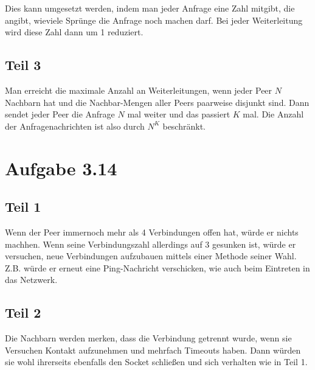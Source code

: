 \documentclass[10pt,a4paper]{article}
\begin{document}
Dies kann umgesetzt werden, indem man jeder Anfrage eine Zahl mitgibt, die
angibt, wieviele Sprünge die Anfrage noch machen darf. Bei jeder Weiterleitung
wird diese Zahl dann um 1 reduziert.

\subsection{Teil 3}

Man erreicht die maximale Anzahl an Weiterleitungen, wenn jeder Peer $N$
Nachbarn hat und die Nachbar-Mengen aller Peers paarweise disjunkt sind.  Dann
sendet jeder Peer die Anfrage $N$ mal weiter und das passiert $K$ mal. Die
Anzahl der Anfragenachrichten ist also durch $N^{K}$ beschränkt.

\section{Aufgabe 3.14}

\subsection{Teil 1}

Wenn der Peer immernoch mehr als 4 Verbindungen offen hat, würde er nichts
machhen. Wenn seine Verbindungszahl allerdings auf $3$ gesunken ist, würde er
versuchen, neue Verbindungen aufzubauen mittels einer Methode seiner
Wahl. Z.B. würde er erneut eine Ping-Nachricht verschicken, wie auch beim
Eintreten in das Netzwerk.

\subsection{Teil 2}

Die Nachbarn werden merken, dass die Verbindung getrennt wurde, wenn sie
Versuchen Kontakt aufzunehmen und mehrfach Timeouts haben. Dann würden sie wohl
ihrerseits ebenfalls den Socket schließen und sich verhalten wie in Teil 1.
\end{document}
